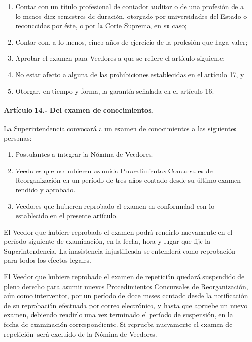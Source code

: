\documentclass[
]{book}
\begin{document}
\begin{enumerate}
\def\labelenumi{\arabic{enumi})}
\item
  Contar con un título profesional de contador auditor o de una profesión de a lo menos diez semestres de duración, otorgado por universidades del Estado o reconocidas por éste, o por la Corte Suprema, en su caso;
\item
  Contar con, a lo menos, cinco años de ejercicio de la profesión que haga valer;
\item
  Aprobar el examen para Veedores a que se refiere el artículo siguiente;
\item
  No estar afecto a alguna de las prohibiciones establecidas en el artículo 17, y
\item
  Otorgar, en tiempo y forma, la garantía señalada en el artículo 16.
\end{enumerate}

\hypertarget{artuxedculo-14.--del-examen-de-conocimientos.}{%
\paragraph*{Artículo 14.- Del examen de conocimientos.}\label{artuxedculo-14.--del-examen-de-conocimientos.}}

La Superintendencia convocará a un examen de conocimientos a las siguientes personas:

\begin{enumerate}
\def\labelenumi{\arabic{enumi})}
\item
  Postulantes a integrar la Nómina de Veedores.
\item
  Veedores que no hubieren asumido Procedimientos Concursales de Reorganización en un período de tres años contado desde su último examen rendido y aprobado.
\item
  Veedores que hubieren reprobado el examen en conformidad con lo establecido en el presente artículo.
\end{enumerate}

El Veedor que hubiere reprobado el examen podrá rendirlo nuevamente en el período siguiente de examinación, en la fecha, hora y lugar que fije la Superintendencia. La inasistencia injustificada se entenderá como reprobación para todos los efectos legales.

El Veedor que hubiere reprobado el examen de repetición quedará suspendido de pleno derecho para asumir nuevos Procedimientos Concursales de Reorganización, aún como interventor, por un período de doce meses contado desde la notificación de su reprobación efectuada por correo electrónico, y hasta que apruebe un nuevo examen, debiendo rendirlo una vez terminado el período de suspensión, en la fecha de examinación correspondiente. Si reprueba nuevamente el examen de repetición, será excluido de la Nómina de Veedores.
\end{document}

